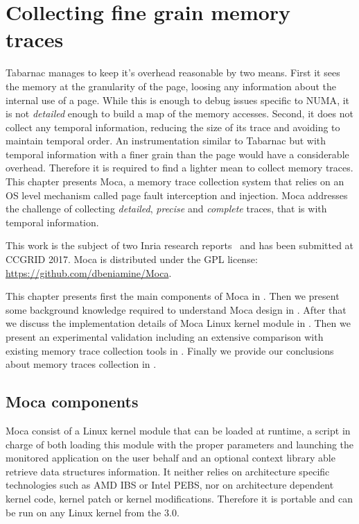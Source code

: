 \chapter{Collecting fine grain memory traces}
\label{chap:moca}

\gls{Tabarnac} manages to keep it's overhead reasonable by two means.
First it sees the memory at the granularity of the page, loosing any information about the internal use of a page.
While this is enough to debug issues specific to \gls{NUMA}, it is not \emph{detailed} enough to build a map of the memory accesses.
Second, it does not collect any temporal information, reducing the size of its trace and avoiding to maintain temporal order.
An instrumentation similar to \gls{Tabarnac} but with temporal information with a finer grain than the page would have a considerable overhead.
Therefore it is required to find a lighter mean to collect memory traces.
This chapter presents \gls{Moca}, a memory trace collection system that  relies on an \gls{OS} level mechanism called page fault interception and injection.
\gls{Moca} addresses the challenge of collecting \emph{detailed}, \emph{precise} and \emph{complete} traces, that is with temporal information.

This work is the subject of two Inria research reports~\cite{Beniamine15Memory,Beniamine16Moca} and has been submitted at \gls{CCGRID} 2017.
\gls{Moca} is distributed under the \gls{GPL} license: \url{https://github.com/dbeniamine/Moca}.

This chapter presents first the main components of \gls{Moca} in .
Then we present some background knowledge required to understand \gls{Moca} design in .
After that we discuss the implementation details of \gls{Moca} \gls{Linux} kernel module in .
Then we present an experimental validation including an extensive comparison with existing memory trace collection tools in .
Finally we provide our conclusions about memory traces collection in .

\section{Moca components}
\label{sec:moca-components}

\gls{Moca} consist of a Linux kernel module that can be loaded at runtime,  a script in charge of both loading this module with the proper parameters and launching the monitored application on the user behalf and an optional context library able retrieve data structures information.
It neither relies on architecture specific technologies such as \gls{AMD} \gls{IBS} or \gls{Intel} \gls{PEBS}, nor on architecture dependent kernel code, kernel patch or kernel modifications.
Therefore it is portable and can be run on any Linux kernel from the $3.0$.

